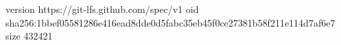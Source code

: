version https://git-lfs.github.com/spec/v1
oid sha256:1bbef05581286e416ead8dde0d5fabc35eb45f0ce27381b58f211e114d7af6e7
size 432421
